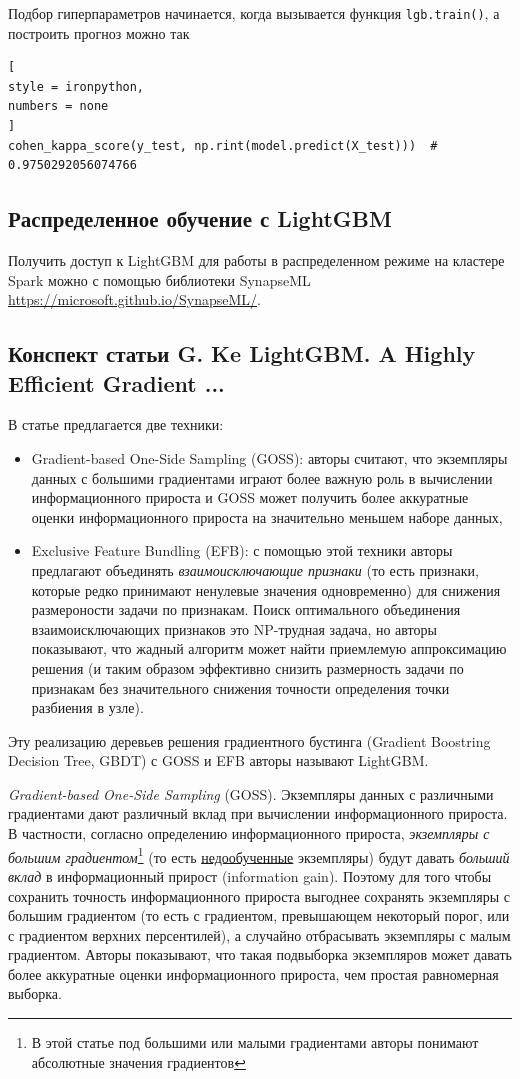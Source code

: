 \documentclass[%
	11pt,
	a4paper,
	utf8,
		]{article}
\begin{document}
Подбор гиперпараметров начинается, когда вызывается функция \verb|lgb.train()|, а построить прогноз можно так
\begin{lstlisting}[
style = ironpython,
numbers = none
]
cohen_kappa_score(y_test, np.rint(model.predict(X_test)))  # 0.9750292056074766
\end{lstlisting}

\subsection{Распределенное обучение с LightGBM}

Получить доступ к LightGBM для работы в распределенном режиме на кластере Spark можно с помощью библиотеки SynapseML \url{https://microsoft.github.io/SynapseML/}.

\subsection{Конспект статьи G. Ke LightGBM. A Highly Efficient Gradient ...}

В статье предлагается две техники:
\begin{itemize}
	\item Gradient-based One-Side Sampling (GOSS): авторы считают, что экземпляры данных с большими градиентами играют более важную роль в вычислении информационного прироста и GOSS может получить более аккуратные оценки информационного прироста на значительно меньшем наборе данных,
	
	\item Exclusive Feature Bundling (EFB): с помощью этой техники авторы предлагают объединять \emph{взаимоисключающие признаки} (то есть признаки, которые редко принимают ненулевые значения одновременно) для снижения размероности задачи по признакам. Поиск оптимального объединения взаимоисключающих признаков это NP-трудная задача, но авторы показывают, что жадный алгоритм может найти приемлемую аппроксимацию решения (и таким образом эффективно снизить размерность задачи по признакам без значительного снижения точности определения точки разбиения в узле).
\end{itemize}

Эту реализацию деревьев решения градиентного бустинга (Gradient Boostring Decision Tree, GBDT) с GOSS и EFB авторы называют LightGBM. 

\emph{Gradient-based One-Side Sampling} (GOSS). Экземпляры данных с различными градиентами дают различный вклад при вычислении информационного прироста. В частности, согласно определению информационного прироста, \emph{экземпляры с большим градиентом}\footnote{В этой статье под большими или малыми градиентами авторы понимают абсолютные значения градиентов} (то есть \underline{недообученные} экземпляры) будут давать \emph{больший вклад} в информационный прирост (information gain). Поэтому для того чтобы сохранить точность информационного прироста выгоднее сохранять экземпляры с большим градиентом (то есть с градиентом, превышающем некоторый порог, или с градиентом верхних персентилей), а случайно отбрасывать экземпляры с малым градиентом. Авторы показывают, что такая подвыборка экземпляров может давать более аккуратные оценки информационного прироста, чем простая равномерная выборка.
\end{document}
